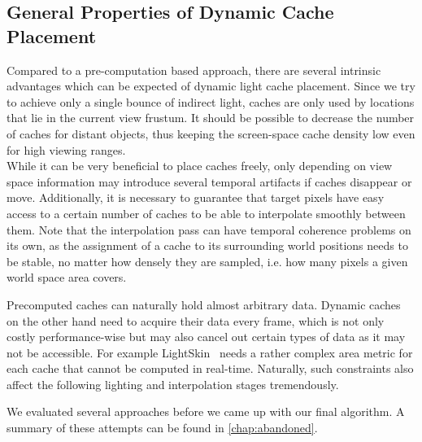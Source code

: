 \documentclass[thesis.tex]{subfiles}
\begin{document}
\subsection{General Properties of Dynamic Cache Placement} \label{sec:impl:dyncacheplace}
Compared to a pre-computation based approach, there are several intrinsic advantages which can be expected of dynamic light cache placement.
Since we try to achieve only a single bounce of indirect light, caches are only used by locations that lie in the current view frustum. %
It should be possible to decrease the number of caches for distant objects, thus keeping the screen-space cache density low even for high viewing ranges.
\\
While it can be very beneficial to place caches freely, only depending on view space information may introduce several temporal artifacts if caches disappear or move. %
Additionally, it is necessary to guarantee that target pixels have easy access to a certain number of caches to be able to interpolate smoothly between them.
Note that the interpolation pass can have temporal coherence problems on its own, as the assignment of a cache to its surrounding world positions needs to be stable, no matter how densely they are sampled, i.e. how many pixels a given world space area covers.

Precomputed caches can naturally hold almost arbitrary data. %
Dynamic caches on the other hand need to acquire their data every frame, which is not only costly performance-wise but may also cancel out certain types of data as it may not be accessible.
For example LightSkin~\cite{bib:LightskinPaper} needs a rather complex area metric for each cache that cannot be computed in real-time.
Naturally, such constraints also affect the following lighting and interpolation stages tremendously.

We evaluated several approaches before we came up with our final algorithm.
A summary of these attempts can be found in \autoref{chap:abandoned}.
\end{document}
